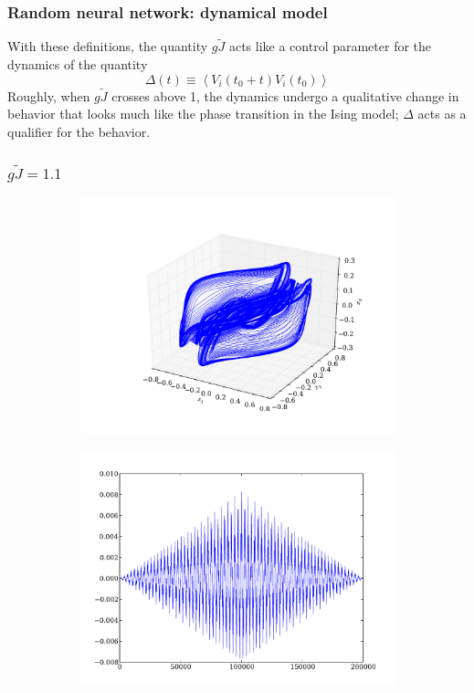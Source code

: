 \documentclass{beamer}
\begin{document}

\begin{frame}
\frametitle{Random neural network: dynamical model}
With these definitions, the quantity $g\tilde{J}$ acts like a control parameter for the dynamics of the quantity
$$ \Delta(t) \equiv \left\langle V_i(t_0+t) V_i(t_0) \right\rangle $$
Roughly, when $g\tilde{J}$ crosses above 1, the dynamics undergo a qualitative change in behavior that looks much like the phase transition in the Ising model; $\Delta$ acts as a qualifier for the behavior.
\end{frame}


\begin{frame}
\frametitle{$g\tilde{J} = 1.1$}
\begin{figure}
	\centering
	\begin{subfigure}[b]{0.49\textwidth}
		\includegraphics[width=\textwidth]{paulfigs/J_1_1_3d}
	\end{subfigure}
	\begin{subfigure}[b]{0.49\textwidth}
		\includegraphics[width=\textwidth]{paulfigs/tcorr_J_1_1}
	\end{subfigure}
\end{figure}
\end{frame}
\end{document}
